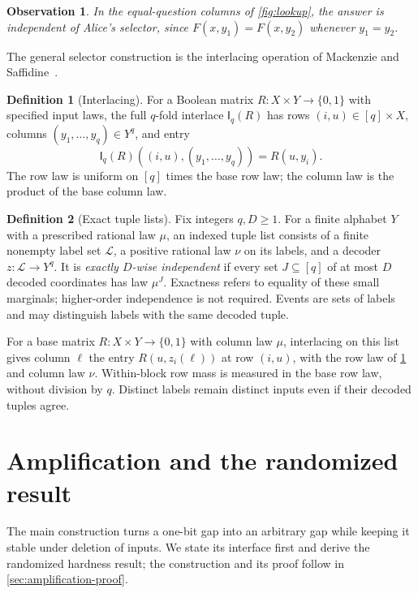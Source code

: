 \documentclass[11pt]{article} \usepackage[utf8]{inputenc}
\theoremstyle{plain} \newtheorem{theorem}{Theorem}[section]
\newtheorem{observation}[observation]{Observation}
\theoremstyle{definition} \newaliascnt{definition}{theorem}
\newtheorem{definition}[definition]{Definition} \aliascntresetthe{definition}
\newcommand{\Int}[2]{\mathsf{I}_{#1}(#2)}
\begin{document}
\begin{observation}\label{ex:lookup-deletion}
In the equal-question columns of \cref{fig:lookup}, the answer is independent
of Alice's selector, since $F(x,y_1)=F(x,y_2)$ whenever $y_1=y_2$.
\end{observation}

The general selector construction is the interlacing operation of
Mackenzie and Saffidine~\cite{mackenzie2025refuting}.

\begin{definition}[Interlacing]\label{def:interlace}
For a Boolean matrix $R:X\times Y\to\{0,1\}$ with specified input laws,
the full $q$-fold interlace $\Int{q}{R}$ has rows $(i,u)\in[q]\times X$,
columns $(y_1,\ldots,y_q)\in Y^q$, and entry
\[
\Int{q}{R}((i,u),(y_1,\ldots,y_q))=R(u,y_i).
\]
The row law is uniform on $[q]$ times the base row law; the column law is
the product of the base column law.
\end{definition}

\begin{definition}[Exact tuple lists]\label{def:exact-tuples}
Fix integers $q,D\ge1$. For a finite alphabet $Y$ with a prescribed
rational law $\mu$,
an indexed tuple list consists of a finite nonempty label set $\mathcal L$,
a positive rational law $\nu$ on its labels, and a decoder
$z:\mathcal L\to Y^q$. It is \emph{exactly $D$-wise independent} if every
set $J\subseteq[q]$ of at most $D$ decoded coordinates has law $\mu^J$.
Exactness refers to equality of these small marginals; higher-order
independence is not required. Events are sets of labels and may distinguish
labels with the same decoded tuple.

For a base matrix $R:X\times Y\to\{0,1\}$ with column law $\mu$,
interlacing on this list gives column $\ell$ the entry $R(u,z_i(\ell))$
at row $(i,u)$, with the row law of \cref{def:interlace} and column law $\nu$.
Within-block row mass is measured in the base row law, without division by
$q$. Distinct labels remain distinct inputs even if their decoded tuples agree.
\end{definition}

\section{Amplification and the randomized result}
\label{sec:unrestricted}

The main construction turns a one-bit gap into an arbitrary gap while keeping
it stable under deletion of inputs. We state its interface first and derive
the randomized hardness result; the construction and its proof follow in
\cref{sec:amplification-proof}.
\end{document}
